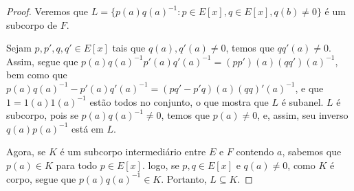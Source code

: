 \begin{proof}
    Veremos que $L=\{p(a)q(a)^{-1}: p \in E[x], q \in E[x], q(b)\neq 0\}$ é um subcorpo de $F$.

    Sejam $p, p', q, q' \in E[x]$ tais que $q(a), q'(a)\neq 0$, temos que $qq'(a)\neq 0$.
    Assim, segue que $p(a)q(a)^{-1}p'(a)q'(a)^{-1}=(pp')(a)(qq')(a)^{-1}$, bem como que $p(a)q(a)^{-1}-p'(a)q'(a)^{-1}=(pq'-p'q)(a)(qq)'(a)^{-1}$, e que $1=1(a)1(a)^{-1}$ estão todos no conjunto, o que mostra que $L$ é subanel.
    $L$ é subcorpo, pois se $p(a)q(a)^{-1}\neq 0$, temos que $p(a)\neq 0$, e, assim, seu inverso $q(a)p(a)^{-1}$ está em $L$.

    Agora, se $K$ é um subcorpo intermediário entre $E$ e $F$ contendo $a$, sabemos que $p(a)\in K$ para todo $p \in E[x]$. logo, se $p, q \in E[x]$ e $q(a)\neq 0$, como $K$ é corpo, segue que $p(a)q(a)^{-1}\in K$. Portanto, $L\subseteq K$.
\end{proof}
 
